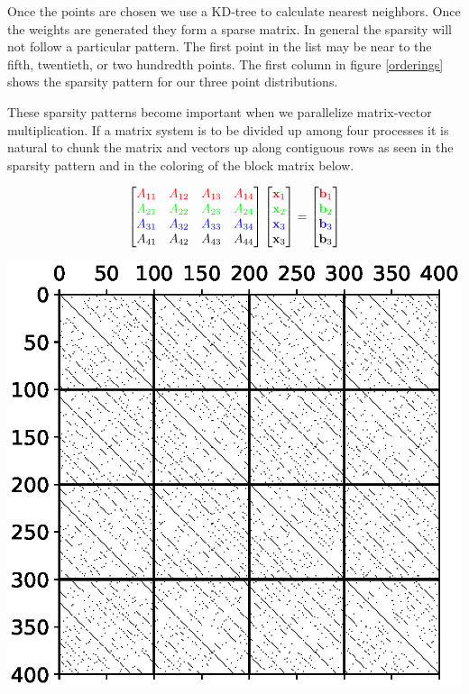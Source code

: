 \documentclass[12pt]{article}
\let\vec\mathbf
\begin{document}
Once the points are chosen we use a KD-tree to calculate nearest neighbors. Once the weights are generated they form a sparse matrix. In general the sparsity will not follow a particular pattern. The first point in the list may be near to the fifth, twentieth, or two hundredth points. The first column in figure \ref{orderings} shows the sparsity pattern for our three point distributions.

These sparsity patterns become important when we parallelize matrix-vector multiplication. If a matrix system is to be divided up among four processes it is natural to chunk the matrix and vectors up along contiguous rows as seen in the sparsity pattern and in the coloring of the block matrix below.

$$
\begin{bmatrix}
	{\color{red} A_{11} } & {\color{red} A_{12} } & {\color{red} A_{13} } & {\color{red} A_{14} }\\
	{\color{green} A_{21} } & {\color{green} A_{22} } & {\color{green} A_{23} } & {\color{green} A_{24} } \\
	{\color{blue} A_{31} } & {\color{blue} A_{32} } & {\color{blue} A_{33} } & {\color{blue} A_{34} } \\
	{\color{black} A_{41} } & {\color{black} A_{42} } & {\color{black} A_{43} } & {\color{black} A_{44} } \\
\end{bmatrix}
\begin{bmatrix}
	{\color{red} \vec{x}_{1} } \\
	{\color{green} \vec{x}_{2} } \\
	{\color{blue} \vec{x}_{3} } \\
	{\color{black} \vec{x}_{3} } 
\end{bmatrix}
=
\begin{bmatrix}
	{\color{red} \vec{b}_{1} } \\
	{\color{green} \vec{b}_{2} } \\
	{\color{blue} \vec{b}_{3} } \\
	{\color{black} \vec{b}_{3} }
	\end{bmatrix}
$$
\begin{center}
	\includegraphics[width=.5\textwidth]{spy_halton_chunked.eps}
\end{center}
\end{document}
